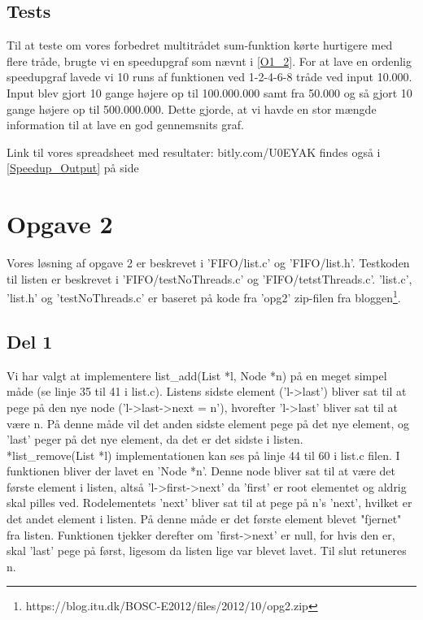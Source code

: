 \subsection{Tests}
\label{O1_Tests}
Til at teste om vores forbedret multitrådet sum-funktion kørte hurtigere med flere tråde, brugte vi en speedupgraf som nævnt i \ref{O1_2}. For at lave en ordenlig speedupgraf lavede vi 10 runs af funktionen ved 1-2-4-6-8 tråde ved input 10.000. Input blev gjort 10 gange højere op til 100.000.000 samt fra 50.000 og så gjort 10 gange højere op til 500.000.000. Dette gjorde, at vi havde en stor mængde information til at lave en god gennemsnits graf. 

Link til vores spreadsheet med resultater:	bitly.com/U0EYAK
findes også i \ref{Speedup_Output} på side \pageref{Speedup_Output}


\section{Opgave 2}
\label{O2}
Vores løsning af opgave 2 er beskrevet i 'FIFO/list.c' og 'FIFO/list.h'. Testkoden til listen er beskrevet i 'FIFO/testNoThreads.c' og 'FIFO/tetstThreads.c'. 'list.c', 'list.h' og 'testNoThreads.c' er baseret på kode fra 'opg2' zip-filen fra bloggen\footnote{https://blog.itu.dk/BOSC-E2012/files/2012/10/opg2.zip}.
\subsection{Del 1}
\label{O2_1}
Vi har valgt at implementere list\_add(List *l, Node *n) på en meget simpel måde (se linje 35 til 41 i list.c). Listens sidste element ('l-\textgreater last') bliver sat til at pege på den nye node ('l-\textgreater last-\textgreater next = n'), hvorefter 'l-\textgreater last' bliver sat til at være n. På denne måde vil det anden sidste element pege på det nye element, og 'last' peger på det nye element, da det er det sidste i listen.
\\*list\_remove(List *l) implementationen kan ses på linje 44 til 60 i list.c filen. I funktionen bliver der lavet en 'Node *n'. Denne node bliver sat til at være det første element i listen, altså 'l-\textgreater first-\textgreater next' da 'first' er root elementet og aldrig skal pilles ved. Rodelementets 'next' bliver sat til at pege på n's 'next', hvilket er det andet element i listen. På denne måde er det første element blevet "fjernet" fra listen. Funktionen tjekker derefter om 'first-\textgreater next' er null, for hvis den er, skal 'last' pege på først, ligesom da listen lige var blevet lavet. Til slut retuneres n.

